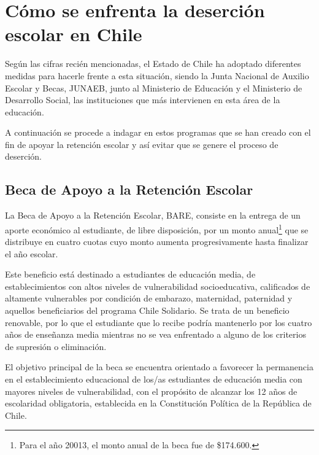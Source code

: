 \section{Cómo se enfrenta la deserción escolar en Chile}
Según las cifras recién mencionadas, el Estado de Chile ha adoptado diferentes medidas para hacerle frente a esta situación, siendo la Junta Nacional de Auxilio Escolar y Becas, JUNAEB, junto al Ministerio de Educación y el Ministerio de Desarrollo Social, las instituciones que más intervienen en esta área de la educación. 

A continuación se procede a indagar en estos programas que se han creado con el fin de apoyar la retención escolar y así evitar que se genere el proceso de deserción. 

\subsection{Beca de Apoyo a la Retención Escolar}
La Beca de Apoyo a la Retención Escolar, BARE, consiste en la entrega de un aporte económico al estudiante, de libre disposición, por un monto anual\footnote{Para el año 20013, el monto anual de la beca fue de \$174.600.} que se distribuye en cuatro cuotas cuyo monto aumenta progresivamente hasta finalizar el año escolar.

Este beneficio está destinado a estudiantes de educación media, de establecimientos con altos niveles de vulnerabilidad socioeducativa, calificados de altamente vulnerables por condición de embarazo, maternidad, paternidad y aquellos beneficiarios del programa Chile Solidario. Se trata de un beneficio renovable, por lo que el estudiante que lo recibe podría mantenerlo por los cuatro años de enseñanza media mientras no se vea enfrentado a alguno de los criterios de supresión o eliminación.

El objetivo principal de la beca se encuentra orientado a favorecer la permanencia en el establecimiento educacional de los/as estudiantes de educación media con mayores niveles de vulnerabilidad, con el propósito de alcanzar los 12 años de escolaridad obligatoria, establecida en la Constitución Política de la República de Chile.

